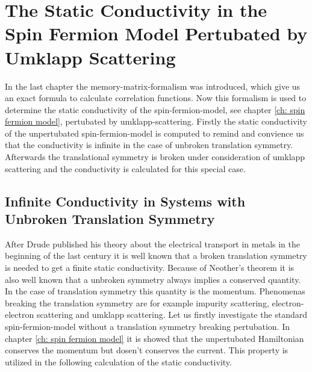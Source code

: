 %
%
%
\chapter{The Static Conductivity in the Spin Fermion Model Pertubated by Umklapp Scattering}
\label{ch: calculation}
%
%
%
In the last chapter the memory-matrix-formalism was introduced, which give us an exact formula to calculate correlation functions.
Now this formalism is used to determine the static conductivity of the spin-fermion-model, see chapter \ref{ch: spin fermion model}, pertubated by umklapp-scattering.
Firstly the static conductivity of the unpertubated spin-fermion-model is computed to remind and convience us that the conductivity is infinite in the case of unbroken translation symmetry.
Afterwards the translational symmetry is broken under consideration of umklapp scattering and the conductivity is calculated for this special case.
%
%
\section{Infinite Conductivity in Systems with Unbroken Translation Symmetry}
\label{sec: Infinite conductivity in a system with unbroken translation symmetry}
%
%
After Drude published his theory about the electrical transport in metals \cite{Drude} in the beginning of the last century it is well known that a broken translation symmetry is needed to get a finite static conductivity.
Because of Neother's theorem \cite{Noether1} it is also well known that a unbroken symmetry always implies a conserved quantity.
In the case of translation symmetry this quantity is the momentum.
Phenomenas breaking the translation symmetry are for example impurity scattering, electron-electron scattering and umklapp scattering.
Let us firstly investigate the standard spin-fermion-model without a translation symmetry breaking pertubation.
In chapter \ref{ch: spin fermion model} it is showed that the unpertubated Hamiltonian conserves the momentum but dosen't conserves the current.
This property is utilized in the following calculation of the static conductivity.

